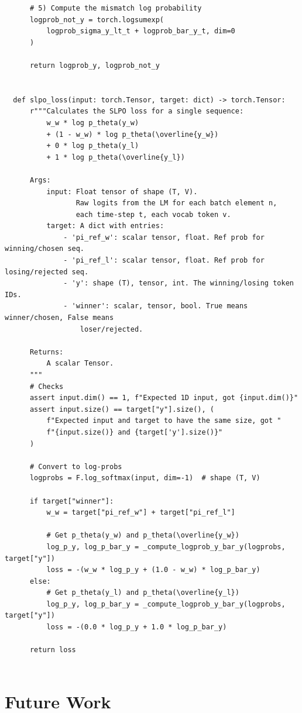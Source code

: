 \documentclass[twoside,11pt]{article}
\begin{document}
\begin{verbatim}
      # 5) Compute the mismatch log probability
      logprob_not_y = torch.logsumexp(
          logprob_sigma_y_lt_t + logprob_bar_y_t, dim=0
      )
  
      return logprob_y, logprob_not_y
  
  
  def slpo_loss(input: torch.Tensor, target: dict) -> torch.Tensor:
      r"""Calculates the SLPO loss for a single sequence:
          w_w * log p_theta(y_w)
          + (1 - w_w) * log p_theta(\overline{y_w})
          + 0 * log p_theta(y_l)
          + 1 * log p_theta(\overline{y_l})
  
      Args:
          input: Float tensor of shape (T, V).
                 Raw logits from the LM for each batch element n,
                 each time-step t, each vocab token v.
          target: A dict with entries:
              - 'pi_ref_w': scalar tensor, float. Ref prob for winning/chosen seq.
              - 'pi_ref_l': scalar tensor, float. Ref prob for losing/rejected seq.
              - 'y': shape (T), tensor, int. The winning/losing token IDs.
              - 'winner': scalar, tensor, bool. True means winner/chosen, False means
                  loser/rejected.
  
      Returns:
          A scalar Tensor.
      """
      # Checks
      assert input.dim() == 1, f"Expected 1D input, got {input.dim()}"
      assert input.size() == target["y"].size(), (
          f"Expected input and target to have the same size, got "
          f"{input.size()} and {target['y'].size()}"
      )
  
      # Convert to log-probs
      logprobs = F.log_softmax(input, dim=-1)  # shape (T, V)
  
      if target["winner"]:
          w_w = target["pi_ref_w"] + target["pi_ref_l"]
  
          # Get p_theta(y_w) and p_theta(\overline{y_w})
          log_p_y, log_p_bar_y = _compute_logprob_y_bar_y(logprobs, target["y"])
          loss = -(w_w * log_p_y + (1.0 - w_w) * log_p_bar_y)
      else:
          # Get p_theta(y_l) and p_theta(\overline{y_l})
          log_p_y, log_p_bar_y = _compute_logprob_y_bar_y(logprobs, target["y"])
          loss = -(0.0 * log_p_y + 1.0 * log_p_bar_y)
  
      return loss
  
\end{verbatim}

\section{Future Work}
\end{document}
